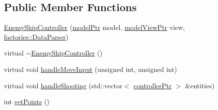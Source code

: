 \subsection*{\-Public \-Member \-Functions}
\begin{DoxyCompactItemize}
\item 
\hyperlink{classcontrollers_1_1EnemyShipController_abca0f3627ca1127e1f73edc7211c38e6}{\-Enemy\-Ship\-Controller} (\hyperlink{ModelView_8h_a78966ddb517fca8d2b29a2bc5c31e74e}{model\-Ptr} model, \hyperlink{Controller_8h_a8ca0a41a38eb52be242997413482c0cf}{model\-View\-Ptr} view, \hyperlink{classfactories_1_1DataParser}{factories\-::\-Data\-Parser})
\item 
virtual \hyperlink{classcontrollers_1_1EnemyShipController_a50d0da86a83de30efb99ebb5a476703c}{$\sim$\-Enemy\-Ship\-Controller} ()
\item 
virtual void \hyperlink{classcontrollers_1_1EnemyShipController_ad8d8e2dc3e035695697afcde01770c48}{handle\-Move\-Input} (unsigned int, unsigned int)
\item 
virtual void \hyperlink{classcontrollers_1_1EnemyShipController_a4913e6039a0fb94f42918a5c1d327458}{handle\-Shooting} (std\-::vector$<$ \hyperlink{namespacecontrollers_ab74cf2ed38c0b0460698b4eb6fe8bec5}{controller\-Ptr} $>$ \&entities)
\item 
int \hyperlink{classcontrollers_1_1EnemyShipController_a4a8842d52c78c05e199c6322e2a91c05}{get\-Points} ()
\end{DoxyCompactItemize}


